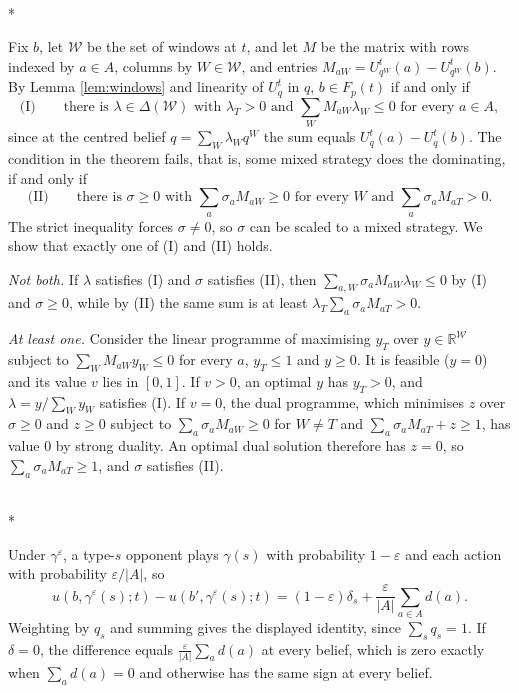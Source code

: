 \documentclass[12pt]{article}
\makeatletter
\theoremstyle{definition}
\renewenvironment{proof}[1][\proofname]{\par
  \pushQED{\qed}%
  \normalfont \topsep6\p@\@plus6\p@\relax
  \trivlist
  \item[\hskip\labelsep\itshape #1\@addpunct{.}]\mbox{}\\*
  \ignorespaces
}{%
  \popQED\endtrivlist\@endpefalse
}
\makeatother
\begin{document}
\begin{proof}[Proof of Theorem \ref{th:dual}]
Fix $b$, let $\mathcal W$ be the set of windows at $t$, and let $M$ be the matrix with rows indexed by $a \in A$, columns by $W \in \mathcal W$, and entries $M_{aW} = U^t_{q^W}(a) - U^t_{q^W}(b)$. By Lemma \ref{lem:windows} and linearity of $U^t_q$ in $q$, $b \in F_p(t)$ if and only if
\[
\text{(I)} \qquad \text{there is } \lambda \in \Delta(\mathcal W) \text{ with } \lambda_T > 0 \text{ and } \textstyle\sum_W M_{aW}\lambda_W \le 0 \text{ for every } a \in A,
\]
since at the centred belief $q = \sum_W \lambda_W q^W$ the sum equals $U^t_q(a) - U^t_q(b)$. The condition in the theorem fails, that is, some mixed strategy does the dominating, if and only if
\[
\text{(II)} \qquad \text{there is } \sigma \ge 0 \text{ with } \textstyle\sum_a \sigma_a M_{aW} \ge 0 \text{ for every } W \text{ and } \sum_a \sigma_a M_{aT} > 0.
\]
The strict inequality forces $\sigma \neq 0$, so $\sigma$ can be scaled to a mixed strategy. We show that exactly one of (I) and (II) holds.

\emph{Not both.} If $\lambda$ satisfies (I) and $\sigma$ satisfies (II), then $\sum_{a, W} \sigma_a M_{aW} \lambda_W \le 0$ by (I) and $\sigma \ge 0$, while by (II) the same sum is at least $\lambda_T \sum_a \sigma_a M_{aT} > 0$.

\emph{At least one.} Consider the linear programme of maximising $y_T$ over $y \in \mathbb{R}^{\mathcal W}$ subject to $\sum_W M_{aW} y_W \le 0$ for every $a$, $y_T \le 1$ and $y \ge 0$. It is feasible ($y = 0$) and its value $v$ lies in $[0, 1]$. If $v > 0$, an optimal $y$ has $y_T > 0$, and $\lambda = y / \sum_W y_W$ satisfies (I). If $v = 0$, the dual programme, which minimises $z$ over $\sigma \ge 0$ and $z \ge 0$ subject to $\sum_a \sigma_a M_{aW} \ge 0$ for $W \neq T$ and $\sum_a \sigma_a M_{aT} + z \ge 1$, has value $0$ by strong duality. An optimal dual solution therefore has $z = 0$, so $\sum_a \sigma_a M_{aT} \ge 1$, and $\sigma$ satisfies (II).
\end{proof}

\begin{proof}[Proof of Proposition \ref{prop:perturb}]
Under $\gamma^\varepsilon$, a type-$s$ opponent plays $\gamma(s)$ with probability $1 - \varepsilon$ and each action with probability $\varepsilon/|A|$, so
\[
u(b, \gamma^\varepsilon(s); t) - u(b', \gamma^\varepsilon(s); t) = (1-\varepsilon)\delta_s + \frac{\varepsilon}{|A|}\sum_{a \in A} d(a).
\]
Weighting by $q_s$ and summing gives the displayed identity, since $\sum_s q_s = 1$. If $\delta = 0$, the difference equals $\frac{\varepsilon}{|A|}\sum_a d(a)$ at every belief, which is zero exactly when $\sum_a d(a) = 0$ and otherwise has the same sign at every belief.
\end{proof}
\end{document}
